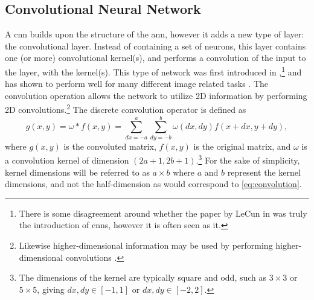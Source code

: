 \subsection{Convolutional Neural Network}
A \gls{cnn} builds upon the structure of the \gls{ann}, however it adds a new type of layer: the convolutional layer. Instead of containing a set of neurons, this layer contains one (or more) convolutional kernel(s), and performs a convolution of the input to the layer, with the kernel(s). This type of network was first introduced in \citeyear{lecun1999object},\footnote{There is some disagreement around whether the paper by LeCun in \citeyear{lecun1999object} \cite{lecun1999object} was truly the introduction of \gls{cnn}s, however it is often seen as it. } and has shown to perform well for many different image related tasks \cite{lecun1999object,alexnet}. The convolution operation allows the network to utilize 2D information by performing 2D convolutions.\footnote{Likewise higher-dimensional information may be used by performing higher-dimensional convolutions \cite{8353466}. }
The discrete convolution operator is defined as \cite[899-901]{cormenalgorithms}
\begin{equation}
    \label{eq:convolution}
    g(x,y) = \omega \ast f(x,y) = \sum_{dx=-a}^{a}\sum_{dy=-b}^{b} \omega(dx,dy)f(x+dx,y+dy),
\end{equation}
where $g(x,y)$ is the convoluted matrix, $f(x,y)$ is the original matrix, and $\omega$ is a convolution kernel of dimension $(2a+1,2b+1)$.\footnote{The dimensions of the kernel are typically square and odd, such as $3\times3$ or $5\times5$, giving $dx,dy\in[-1,1]$ or $dx,dy\in[-2,2]$. } For the sake of simplicity, kernel dimensions will be referred to as $a\times b$ where $a$ and $b$ represent the kernel dimensions, and not the half-dimension as would correspond to \cref{eq:convolution}. 

